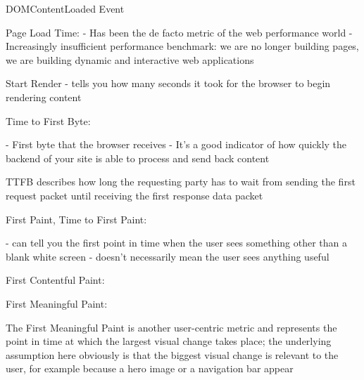 DOMContentLoaded Event %



Page Load Time: %
- Has been the de facto metric of the web performance world
- Increasingly insufficient performance benchmark: we are no longer building pages, we are building dynamic and interactive web applications




Start Render %
- tells you how many seconds it took for the browser to begin rendering content


Time to First Byte: %

- First byte that the browser receives
- It’s a good indicator of how quickly the backend of your site is able to process and send back content


TTFB describes how long the requesting party has to wait from sending the first request packet until receiving the first response data packet







First Paint, Time to First Paint: %


- can tell you the first point in time when the user sees something other than a blank white screen
- doesn’t necessarily mean the user sees anything useful




First Contentful Paint: %



First Meaningful Paint: %

The First Meaningful Paint is another user-centric metric and represents the point in time at which the largest visual change takes place; the underlying assumption here obviously is that the biggest visual change is relevant to the user, for example because a hero image or a navigation bar appear





